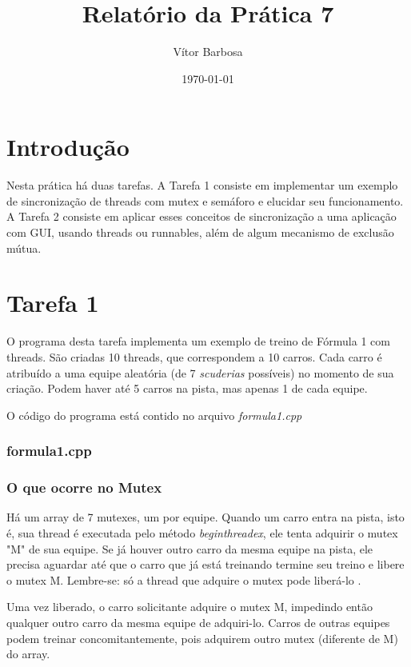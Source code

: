 \documentclass[12pt,a4paper]{article}
\title{Relatório da Prática 7}
\author{Vítor Barbosa}
\date{\today}
\begin{document}
\maketitle

\section{Introdução}
Nesta prática há duas tarefas. A Tarefa 1 consiste em implementar um exemplo de sincronização de threads com mutex e semáforo e elucidar seu funcionamento.
A Tarefa 2 consiste em aplicar esses conceitos de sincronização a uma aplicação com GUI, usando threads ou runnables, além de algum mecanismo de exclusão mútua.

\section{Tarefa 1}
O programa desta tarefa implementa um exemplo de treino de Fórmula 1 com threads. São criadas 10 threads, que correspondem a 10 carros. Cada carro é atribuído a uma equipe aleatória (de 7 \emph{scuderias} possíveis) no momento de sua criação. Podem haver até 5 carros na pista, mas apenas 1 de cada equipe.

O código do programa está contido no arquivo \emph{formula1.cpp}
\subsubsection*{formula1.cpp}


\subsubsection*{O que ocorre no Mutex}

Há um array de 7 mutexes, um por equipe. Quando um carro entra na pista, isto é, sua thread é executada pelo método \emph{beginthreadex}, ele tenta adquirir o mutex "M" de sua equipe. 
Se já houver outro carro da mesma equipe na pista, ele precisa aguardar até que o carro que já está treinando termine seu treino e libere o mutex M. Lembre-se: só a thread que adquire o mutex pode liberá-lo \cite{stack}.

Uma vez liberado, o carro solicitante adquire o mutex M, impedindo então qualquer outro carro da mesma equipe de adquiri-lo.
Carros de outras equipes podem treinar concomitantemente, pois adquirem outro mutex (diferente de M) do array.
\end{document}
